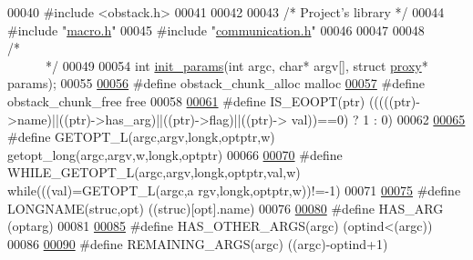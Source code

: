 \begin{DoxyCode}
00040 \textcolor{preprocessor}{#include <obstack.h>}
00041 
00042 
00043         \textcolor{comment}{/*      Project's library       */}
00044 \textcolor{preprocessor}{#include "\hyperlink{macro_8h}{macro.h}"}
00045 \textcolor{preprocessor}{#include "\hyperlink{communication_8h}{communication.h}"}
00046 
00047 
00048 \textcolor{comment}{/*~~~~~~~~~~~~~~~~~~~~~~~~~~~~~~~~~~~~~~~~~~~~~~~~~~~~~~~~~~~~~~~~~~~~~~~~~~~~*/}
00049 
00054 \textcolor{keywordtype}{int} \hyperlink{params_8h_afaf7d30794de45a759063054ec9257a8}{init_params}(\textcolor{keywordtype}{int} argc, \textcolor{keywordtype}{char}* argv[], \textcolor{keyword}{struct} \hyperlink{structproxy}{proxy}* params);
00055 
\hypertarget{params_8h_source_l00056}{}\hyperlink{params_8h_afe107f8385341e11aef32eaac290b39a}{00056} \textcolor{preprocessor}{#define obstack\_chunk\_alloc malloc}
\hypertarget{params_8h_source_l00057}{}\hyperlink{params_8h_a10ffd65176663f1396a3607ebb41470c}{00057} \textcolor{preprocessor}{}\textcolor{preprocessor}{#define obstack\_chunk\_free  free}
00058 \textcolor{preprocessor}{}
\hypertarget{params_8h_source_l00061}{}\hyperlink{params_8h_a44ee6dcb438ae8dc40790c3fe7154f7f}{00061} \textcolor{preprocessor}{#define IS\_EOOPT(ptr) (((((ptr)->name)||((ptr)->has\_arg)||((ptr)->flag)||((ptr)->
      val))==0) ? 1 : 0)}
00062 \textcolor{preprocessor}{}
\hypertarget{params_8h_source_l00065}{}\hyperlink{params_8h_a8d0dd189eff26f611d22d7a7ad388683}{00065} \textcolor{preprocessor}{#define GETOPT\_L(argc,argv,longk,optptr,w) getopt\_long(argc,argv,w,longk,optptr)}
00066 \textcolor{preprocessor}{}
\hypertarget{params_8h_source_l00070}{}\hyperlink{params_8h_aedb4daf5fe76858cd084783779297d79}{00070} \textcolor{preprocessor}{#define WHILE\_GETOPT\_L(argc,argv,longk,optptr,val,w) while(((val)=GETOPT\_L(argc,a
      rgv,longk,optptr,w))!=-1)}
00071 \textcolor{preprocessor}{}
\hypertarget{params_8h_source_l00075}{}\hyperlink{params_8h_a09bfcda4b6271c0433fe966790b97d41}{00075} \textcolor{preprocessor}{#define LONGNAME(struc,opt)             ((struc)[opt].name)}
00076 \textcolor{preprocessor}{}
\hypertarget{params_8h_source_l00080}{}\hyperlink{params_8h_affec572f11fcba59ce0cd49cbcd0110f}{00080} \textcolor{preprocessor}{#define HAS\_ARG                         (optarg)}
00081 \textcolor{preprocessor}{}
\hypertarget{params_8h_source_l00085}{}\hyperlink{params_8h_a5aa18e1ec393434183b928424fad7f77}{00085} \textcolor{preprocessor}{#define HAS\_OTHER\_ARGS(argc)            (optind<(argc))}
00086 \textcolor{preprocessor}{}
\hypertarget{params_8h_source_l00090}{}\hyperlink{params_8h_a52cb524154eeb8941bf2601e8078bcf4}{00090} \textcolor{preprocessor}{#define REMAINING\_ARGS(argc)            ((argc)-optind+1)}

\end{DoxyCode}

